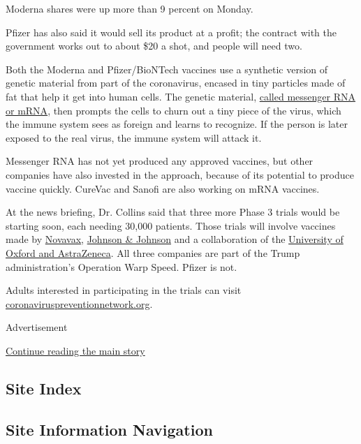 Moderna shares were up more than 9 percent on Monday.

Pfizer has also said it would sell its product at a profit; the contract
with the government works out to about \$20 a shot, and people will need
two.

Both the Moderna and Pfizer/BioNTech vaccines use a synthetic version of
genetic material from part of the coronavirus, encased in tiny particles
made of fat that help it get into human cells. The genetic material,
\href{https://www.nytimes3xbfgragh.onion/interactive/2020/05/20/science/coronavirus-vaccine-development.html}{called
messenger RNA or mRNA}, then prompts the cells to churn out a tiny piece
of the virus, which the immune system sees as foreign and learns to
recognize. If the person is later exposed to the real virus, the immune
system will attack it.

Messenger RNA has not yet produced any approved vaccines, but other
companies have also invested in the approach, because of its potential
to produce vaccine quickly. CureVac and Sanofi are also working on mRNA
vaccines.

At the news briefing, Dr. Collins said that three more Phase 3 trials
would be starting soon, each needing 30,000 patients. Those trials will
involve vaccines made by
\href{https://www.nytimes3xbfgragh.onion/2020/07/16/health/coronavirus-vaccine-novavax.html}{Novavax},
\href{https://www.nytimes3xbfgragh.onion/2020/07/17/health/coronavirus-vaccine-johnson-janssen.html}{Johnson
\& Johnson} and a collaboration of the
\href{https://www.nytimes3xbfgragh.onion/2020/07/20/world/covid-coronavirus-vaccine.html}{University
of Oxford and AstraZeneca}. All three companies are part of the Trump
administration's Operation Warp Speed. Pfizer is not.

Adults interested in participating in the trials can visit
\href{https://www.coronaviruspreventionnetwork.org/}{coronaviruspreventionnetwork.org}.

Advertisement

\protect\hyperlink{after-bottom}{Continue reading the main story}

\hypertarget{site-index}{%
\subsection{Site Index}\label{site-index}}

\hypertarget{site-information-navigation}{%
\subsection{Site Information
Navigation}\label{site-information-navigation}}

